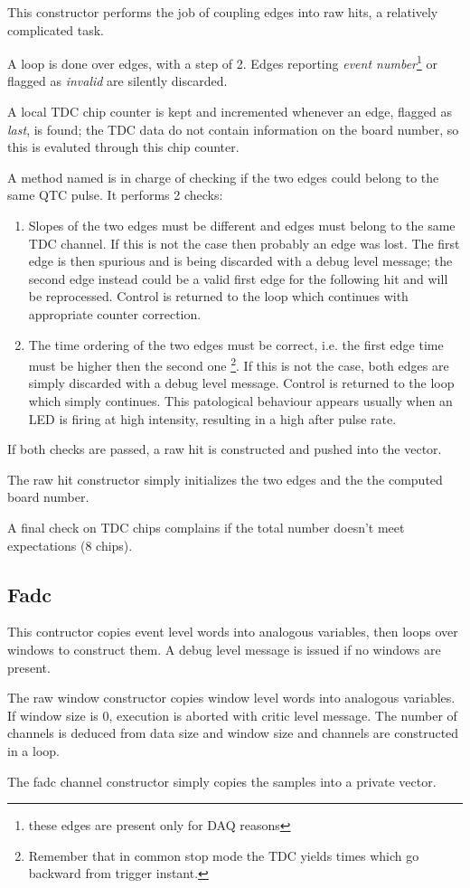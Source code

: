 This constructor performs the job of coupling edges into raw hits, a relatively complicated task.

A loop is done over edges, with a step of 2.
Edges reporting \emph{event number}\footnote{these edges are present only for DAQ reasons} or flagged as \emph{invalid} are silently discarded.

A local TDC chip counter is kept and incremented whenever an edge, flagged as \emph{last}, is found; 
the TDC data do not contain information on the board number, so this is evaluted through this chip counter.

A method named  is in charge of checking if the two edges could belong to the same QTC pulse.
It performs 2 checks:
\begin{enumerate}
\item Slopes of the two edges must be different and edges must belong to the same TDC channel. 
If this is not the case then probably an edge was lost. The first edge is then spurious and is being discarded with a debug level message;
the second edge instead could be a valid first edge for the following hit and will be reprocessed. 
Control is returned to the loop which continues with appropriate counter correction.
\item The time ordering of the two edges must be correct, i.e. the first edge time must be higher then the second one
\footnote{Remember that in common stop mode the TDC yields times which go backward from trigger instant.}.
If this is not the case, both edges are simply discarded with a debug level message. 
Control is returned to the loop which simply continues.
This patological behaviour appears usually when an LED is firing at high intensity, resulting in a high after pulse rate. 
\end{enumerate}
If both checks are passed, a raw hit is constructed and pushed into the vector.

The raw hit constructor simply initializes the two edges and the the computed board number.

A final check on TDC chips complains if the total number doesn't meet expectations (8 chips).


\subsection{Fadc}

This contructor copies event level words into analogous variables, then loops over windows to construct them.
A debug level message is issued if no windows are present.

The raw window constructor copies window level words into analogous variables.
If window size is 0, execution is aborted with critic level message.
The number of channels is deduced from data size and window size and channels are constructed in a loop.

The fadc channel constructor simply copies the samples into a private vector.